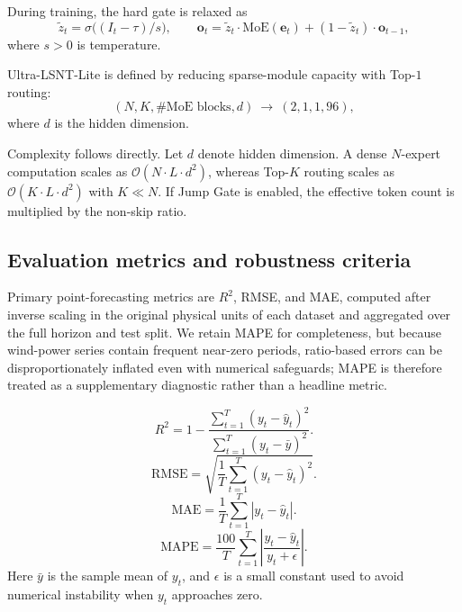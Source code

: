 ﻿\documentclass[review,1p,times]{elsarticle}
\begin{document}
During training, the hard gate is relaxed as
\[
\tilde z_t=\sigma\!\big((I_t-\tau)/s\big),\qquad
\mathbf{o}_t = \tilde z_t\cdot\mathrm{MoE}(\mathbf{e}_t) + (1-\tilde z_t)\cdot\mathbf{o}_{t-1},
\]
where $s>0$ is temperature.


Ultra-LSNT-Lite is defined by reducing sparse-module capacity with Top-$1$ routing:
\begin{equation}
(N,K,\text{\#MoE blocks},d) \ \rightarrow \ (2,1,1,96),
\end{equation}
where $d$ is the hidden dimension.


Complexity follows directly.\label{sec:complexity}
Let $d$ denote hidden dimension. A dense $N$-expert computation scales as $\mathcal{O}(N\cdot L \cdot d^2)$, whereas Top-$K$ routing scales as $\mathcal{O}(K\cdot L \cdot d^2)$ with $K\ll N$. If Jump Gate is enabled, the effective token count is multiplied by the non-skip ratio.

\subsection{Evaluation metrics and robustness criteria}
\label{subsec:eval_metrics}

Primary point-forecasting metrics are $R^2$, RMSE, and MAE, computed after inverse scaling in the original physical units of each dataset and aggregated over the full horizon and test split. We retain MAPE for completeness, but because wind-power series contain frequent near-zero periods, ratio-based errors can be disproportionately inflated even with numerical safeguards; MAPE is therefore treated as a supplementary diagnostic rather than a headline metric.

\begin{equation}
R^2 = 1 - \frac{\sum_{t=1}^{T}(y_t - \hat{y}_t)^2}{\sum_{t=1}^{T}(y_t - \bar{y})^2}.
\end{equation}
\begin{equation}
\text{RMSE} = \sqrt{\frac{1}{T}\sum_{t=1}^{T}(y_t - \hat{y}_t)^2}.
\end{equation}
\begin{equation}
\text{MAE} = \frac{1}{T}\sum_{t=1}^{T}|y_t - \hat{y}_t|.
\end{equation}
\begin{equation}
\text{MAPE} = \frac{100}{T}\sum_{t=1}^{T}\left|\frac{y_t - \hat{y}_t}{y_t + \epsilon}\right|.
\end{equation}
Here $\bar{y}$ is the sample mean of $y_t$, and $\epsilon$ is a small constant used to avoid numerical instability when $y_t$ approaches zero.
\end{document}
